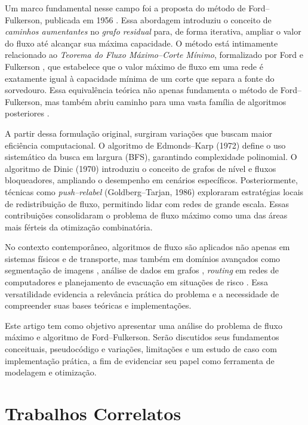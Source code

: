 \documentclass[12pt]{article}
\begin{document}
\noindent Um marco fundamental nesse campo foi a proposta do método de Ford–Fulkerson, publicada em 1956 \cite{ford1956}. Essa abordagem introduziu o conceito de \emph{caminhos aumentantes} no \emph{grafo residual} para, de forma iterativa, ampliar o valor do fluxo até alcançar sua máxima capacidade. O método está intimamente relacionado ao \emph{Teorema do Fluxo Máximo–Corte Mínimo}, formalizado por Ford e Fulkerson \cite{ford1956}, que estabelece que o valor máximo de fluxo em uma rede é exatamente igual à capacidade mínima de um corte que separa a fonte do sorvedouro. Essa equivalência teórica não apenas fundamenta o método de Ford–Fulkerson, mas também abriu caminho para uma vasta família de algoritmos posteriores \cite{cormen2009}.

\noindent A partir dessa formulação original, surgiram variações que buscam maior eficiência computacional. O algoritmo de Edmonds–Karp (1972) \cite{edmonds1972} define o uso sistemático da busca em largura (BFS), garantindo complexidade polinomial. O algoritmo de Dinic (1970) \cite{dinic1970} introduziu o conceito de grafos de nível e fluxos bloqueadores, ampliando o desempenho em cenários específicos. Posteriormente, técnicas como \emph{push–relabel} (Goldberg–Tarjan, 1986) \cite{goldberg1988} exploraram estratégias locais de redistribuição de fluxo, permitindo lidar com redes de grande escala. Essas contribuições consolidaram o problema de fluxo máximo como uma das áreas mais férteis da otimização combinatória.

\noindent No contexto contemporâneo, algoritmos de fluxo são aplicados não apenas em sistemas físicos e de transporte, mas também em domínios avançados como segmentação de imagens \cite{boykov2001}, análise de dados em grafos \cite{ahuja1993}, \emph{routing} em redes de computadores \cite{kleinberg2006} e planejamento de evacuação em situações de risco \cite{chen2010}. Essa versatilidade evidencia a relevância prática do problema e a necessidade de compreender suas bases teóricas e implementações.

\noindent Este artigo tem como objetivo apresentar uma análise do problema de fluxo máximo e algoritmo de Ford–Fulkerson. Serão discutidos seus fundamentos conceituais, pseudocódigo e variações, limitações e um estudo de caso com implementação prática, a fim de evidenciar seu papel como ferramenta de modelagem e otimização.


\section{Trabalhos Correlatos} \label{sec:firstpage}
\end{document}
